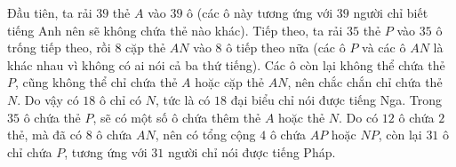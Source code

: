 \begin{multicols}{2}
\begin{figure}[H]
		\vspace*{-15pt}
	\end{figure}
	Đầu tiên, ta rải $39$ thẻ $A$ vào $39$ ô (các ô này tương ứng với $39$ người chỉ biết tiếng Anh nên sẽ không chứa thẻ nào khác). Tiếp theo, ta rải $35$ thẻ $P$ vào $35$ ô trống tiếp theo, rồi $8$ cặp thẻ $AN$ vào $8$ ô tiếp theo nữa (các ô $P$ và các ô $AN$ là khác nhau vì không có ai nói cả ba thứ tiếng). Các ô còn lại không thể chứa thẻ $P$, cũng không thể chỉ chứa thẻ $A$ hoặc cặp thẻ $AN$, nên chắc chắn chỉ chứa thẻ $N$. Do vậy có $18$ ô chỉ có $N$, tức là có $18$ đại biểu chỉ nói được tiếng Nga.
	\vskip 0.1cm
	Trong $35$ ô chứa thẻ $P$, sẽ có một số ô chứa thêm thẻ $A$ hoặc thẻ $N$. Do có $12$ ô chứa $2$ thẻ, mà đã có $8$ ô chứa $AN$, nên có tổng cộng $4$ ô chứa $AP$ hoặc $NP$, còn lại $31$ ô chỉ chứa $P$, tương ứng với $31$ người chỉ nói được tiếng Pháp.
	\vskip 0.1cm

\end{multicols}
